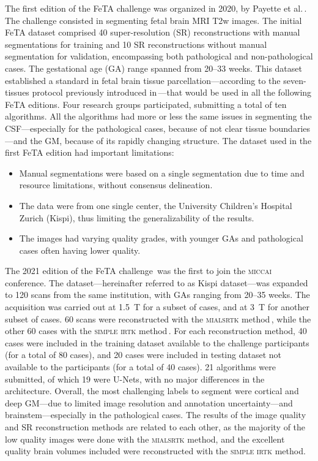 The first edition of the FeTA challenge was organized in 2020, by Payette et al.\,\cite{Payette2021}. The challenge consisted in segmenting fetal brain MRI T2w images. The initial FeTA dataset comprised \num{40} super-resolution (SR) reconstructions with manual segmentations for training and \num{10} SR reconstructions without manual segmentation for validation, encompassing both pathological and non-pathological cases. The gestational age (GA) range spanned from \numrange{20}{33} weeks. This dataset established a standard in fetal brain tissue parcellation---according to the seven-tissues protocol previously introduced in\,\cite{Payette2020}---that would be used in all the following FeTA editions. Four research groups participated, submitting a total of ten algorithms. All the algorithms had more or less the same issues in segmenting the CSF---especially for the pathological cases, because of not clear tissue boundaries---and the GM, because of its rapidly changing structure.
The dataset used in the first FeTA edition had important limitations:
\begin{itemize}
    \item Manual segmentations were based on a single segmentation due to time and resource limitations, without consensus delineation.
    \item The data were from one single center, the University Children's Hospital Zurich (Kispi), thus limiting the generalizability of the results.
    \item The images had varying quality grades, with younger GAs and pathological cases often having lower quality.
\end{itemize}

The 2021 edition of the FeTA challenge\,\cite{FeTA2021_review, FeTA2021} was the first to join the \textsc{miccai} conference. The dataset---hereinafter referred to as Kispi dataset---was expanded to \num{120} scans from the same institution, with GAs ranging from \numrange{20}{35} weeks. The acquisition was carried out at \qty{1.5}{\tesla} for a subset of cases, and at \qty{3}{\tesla} for another subset of cases. \num{60} scans were reconstructed with the \textsc{mialsrtk} method\,\cite{Tourbier2015, MIALSRTK}, while the other \num{60} cases with the \textsc{simple irtk} method\,\cite{Kuklisova2012, irtk-simple}. For each reconstruction method, \num{40} cases were included in the training dataset available to the challenge participants (for a total of \num{80} cases), and \num{20} cases were included in testing dataset not available to the participants (for a total of \num{40} cases). \num{21} algorithms were submitted, of which \num{19} were U-Nets, with no major differences in the architecture. Overall, the most challenging labels to segment were cortical and deep GM---due to limited image resolution and annotation uncertainty---and brainstem---especially in the pathological cases. The results of the image quality and SR reconstruction methods are related to each other, as the majority of the low quality images were done with the \textsc{mialsrtk} method, and the excellent quality brain volumes included were reconstructed with the \textsc{simple irtk} method.

